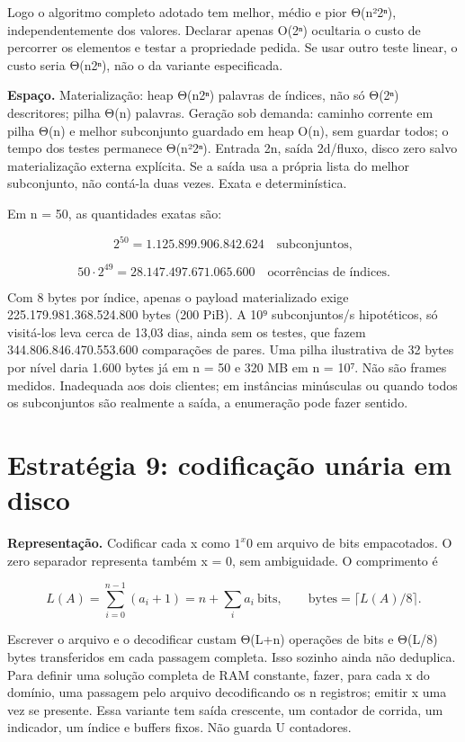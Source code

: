 \documentclass[
  brazilian,
  11pt,
  a4paper,
]{article}
\let\oldsection\section
\renewcommand{\section}{\Needspace{6\baselineskip}\oldsection}
\begin{document}
Logo o algoritmo completo adotado tem melhor, médio e pior Θ(n²2ⁿ),
independentemente dos valores. Declarar apenas O(2ⁿ) ocultaria o custo
de percorrer os elementos e testar a propriedade pedida. Se usar outro
teste linear, o custo seria Θ(n2ⁿ), não o da variante especificada.

\textbf{Espaço.} Materialização: heap Θ(n2ⁿ) palavras de índices, não só
Θ(2ⁿ) descritores; pilha Θ(n) palavras. Geração sob demanda: caminho
corrente em pilha Θ(n) e melhor subconjunto guardado em heap O(n), sem
guardar todos; o tempo dos testes permanece Θ(n²2ⁿ). Entrada 2n, saída
2d/fluxo, disco zero salvo materialização externa explícita. Se a saída
usa a própria lista do melhor subconjunto, não contá-la duas vezes.
Exata e determinística.

Em n = 50, as quantidades exatas são:

\[2^{50}=1.125.899.906.842.624\quad\text{subconjuntos},\]

\[50\cdot2^{49}=28.147.497.671.065.600\quad\text{ocorrências de índices}.\]

Com 8 bytes por índice, apenas o payload materializado exige
225.179.981.368.524.800 bytes (200 PiB). A 10⁹ subconjuntos/s
hipotéticos, só visitá-los leva cerca de 13,03 dias, ainda sem os
testes, que fazem 344.806.846.470.553.600 comparações de pares. Uma
pilha ilustrativa de 32 bytes por nível daria 1.600 bytes já em n = 50 e
320 MB em n = 10⁷. Não são frames medidos. Inadequada aos dois clientes;
em instâncias minúsculas ou quando todos os subconjuntos são realmente a
saída, a enumeração pode fazer sentido.

\section{Estratégia 9: codificação unária em
disco}\label{estratuxe9gia-9-codificauxe7uxe3o-unuxe1ria-em-disco}

\textbf{Representação.} Codificar cada x como \(1^x0\) em arquivo de
bits empacotados. O zero separador representa também x = 0, sem
ambiguidade. O comprimento é

\[L(A)=\sum_{i=0}^{n-1}(a_i+1)=n+\sum_i a_i\ \text{bits},\qquad
\text{bytes}=\lceil L(A)/8\rceil.\]

Escrever o arquivo e o decodificar custam Θ(L+n) operações de bits e
Θ(L/8) bytes transferidos em cada passagem completa. Isso sozinho ainda
não deduplica. Para definir uma solução completa de RAM constante,
fazer, para cada x do domínio, uma passagem pelo arquivo decodificando
os n registros; emitir x uma vez se presente. Essa variante tem saída
crescente, um contador de corrida, um indicador, um índice e buffers
fixos. Não guarda U contadores.
\end{document}
